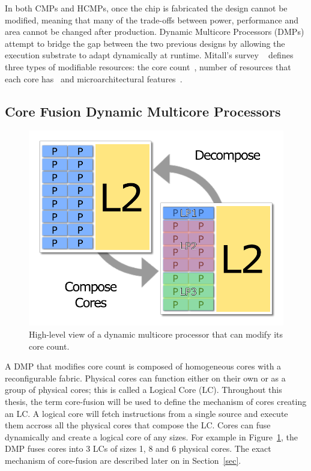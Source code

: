 
In both CMPs and HCMPs, once the chip is fabricated the design cannot be modified, meaning that many of the trade-offs between power, performance and area cannot be changed after production.
Dynamic Multicore Processors (DMPs) attempt to bridge the gap between the two previous designs by allowing the execution substrate to adapt dynamically at runtime.
Mitall's survey ~\cite{MittalSurv2016} defines three types of modifiable resources: the core count~\cite{ipek2007CoreFusion}, number of resources that each core has~\cite{Homayoun3DPooling2012} and microarchitectural features~\cite{fallinhetblock2014,BauerRSE08,tavanaElastic}.

\subsection{Core Fusion Dynamic Multicore Processors}

\begin{figure}[t]
    \centering
    \includegraphics[width=.7\textwidth]{streamit-paper/graphics/dmcgraph.pdf}
    \caption{High-level view of a dynamic multicore processor that can modify its core count.}
    \label{fig:dynmulticore}
\end{figure}

A DMP that modifies core count is composed of homogeneous cores with a reconfigurable fabric.
Physical cores can function either on their own or as a group of physical cores; this is called a Logical Core (LC).
Throughout this thesis, the term core-fusion will be used to define the mechanism of cores creating an LC.
A logical core will fetch instructions from a single source and execute them accross all the physical cores that compose the LC.
Cores can fuse dynamically and create a logical core of any sizes.
For example in Figure~\ref{fig:dynmulticore}, the DMP fuses cores into 3 LCs of sizes 1, 8 and 6 physical cores.
The exact mechanism of core-fusion are described later on in Section~\ref{sec}.

